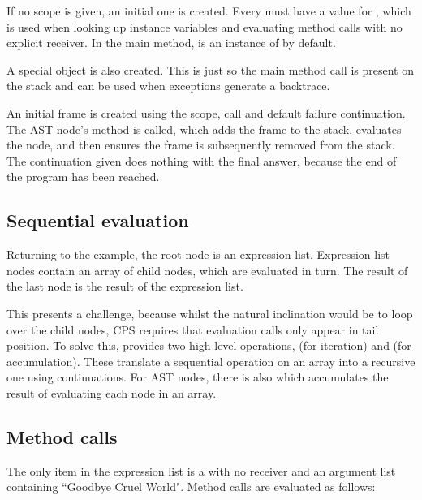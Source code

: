 If no scope is given, an initial one is created. Every  must have a value for , which is used when looking up instance variables and evaluating method calls with no explicit receiver. In the main method,  is an instance of  by default.

A special  object is also created. This is just so the main method call is present on the stack and can be used when exceptions generate a backtrace.

An initial frame is created using the scope, call and default failure continuation. The AST node's  method is called, which adds the frame to the stack, evaluates the node, and then ensures the frame is subsequently removed from the stack. The continuation given does nothing with the final answer, because the end of the program has been reached.

\subsection{Sequential evaluation}

Returning to the example, the root node is an expression list. Expression list nodes contain an array of child nodes, which are evaluated in turn. The result of the last node is the result of the expression list.

This presents a challenge, because whilst the natural inclination would be to loop over the child nodes, CPS requires that evaluation calls only appear in tail position. To solve this,  provides two high-level operations,  (for iteration) and  (for accumulation). These translate a sequential operation on an array into a recursive one using continuations. For AST nodes, there is also  which accumulates the result of evaluating each node in an array.

\subsection{Method calls}

The only item in the expression list is a  with no receiver and an argument list containing ``Goodbye Cruel World". Method calls are evaluated as follows:

